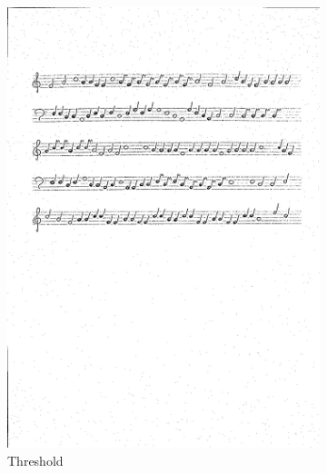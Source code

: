 \documentclass[11pt]{article}
\begin{document}
\begin{figure}[H]
    \centering
    \begin{subfigure}{.5\textwidth}
        \centering
        \graphicspath{ {staffs/} }
        \includegraphics[width=\linewidth]{staffs4_thr.png}
        \caption{Threshold}
        \label{fig:sub1}
    \end{subfigure}%
    \begin{subfigure}{.5\textwidth}
        \centering
        \graphicspath{ {staffs/} }

\end{subfigure}
\end{figure}
\end{document}
